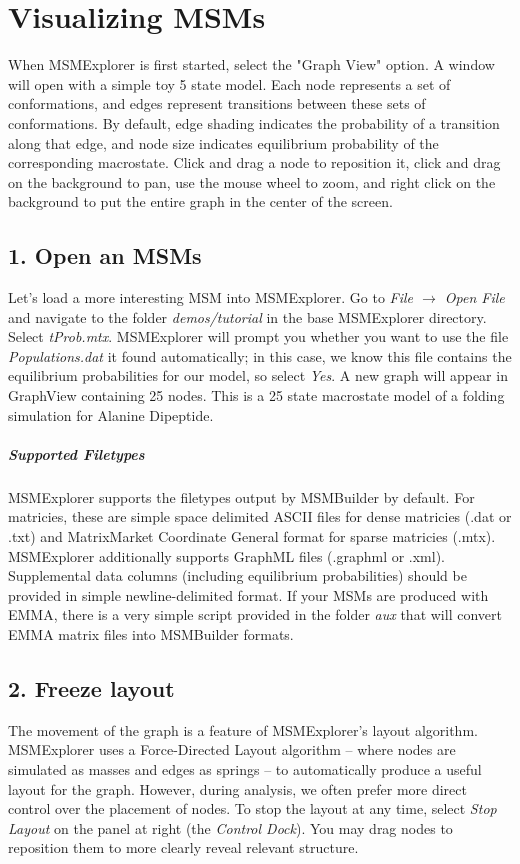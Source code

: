 \documentclass[10pt,a4paper]{report}
\begin{document}
\section*{Visualizing MSMs}
When MSMExplorer is first started, select the "Graph View" option. A window will open with a simple toy 5 state model. Each node represents a set of conformations, and edges represent transitions between these sets of conformations. By default, edge shading indicates the probability of a transition along that edge, and node size indicates equilibrium probability of the corresponding macrostate. Click and drag a node to reposition it, click and drag on the background to pan, use the mouse wheel to zoom, and right click on the background to put the entire graph in the center of the screen.
\subsection*{1. Open an MSMs}
Let's load a more interesting MSM into MSMExplorer. Go to \emph{File $\rightarrow$ Open File} and navigate to the folder \emph{demos/tutorial} in the base MSMExplorer directory. Select \emph{tProb.mtx}. MSMExplorer will prompt you whether you want to use the file \emph{Populations.dat} it found automatically; in this case, we know this file contains the equilibrium probabilities for our model, so select \emph{Yes}. A new graph will appear in GraphView containing 25 nodes. This is a 25 state macrostate model of a folding simulation for Alanine Dipeptide.

\subparagraph*{Supported Filetypes}
MSMExplorer supports the filetypes output by MSMBuilder by default. For matricies, these are simple space delimited ASCII files for dense matricies (.dat or .txt) and MatrixMarket Coordinate General format for sparse matricies (.mtx). MSMExplorer additionally supports GraphML files (.graphml or .xml). Supplemental data columns (including equilibrium probabilities) should be provided in simple newline-delimited format. If your MSMs are produced with EMMA, there is a very simple script provided in the folder \emph{aux} that will convert EMMA matrix files into MSMBuilder formats.

\subsection*{2. Freeze layout}
The movement of the graph is a feature of MSMExplorer's layout algorithm. MSMExplorer uses a Force-Directed Layout algorithm -- where nodes are simulated as masses and edges as springs -- to automatically produce a useful layout for the graph. However, during analysis, we often prefer more direct control over the placement of nodes. To stop the layout at any time, select \emph{Stop Layout} on the panel at right (the \emph{Control Dock}). You may drag nodes to reposition them to more clearly reveal relevant structure.
\end{document}
